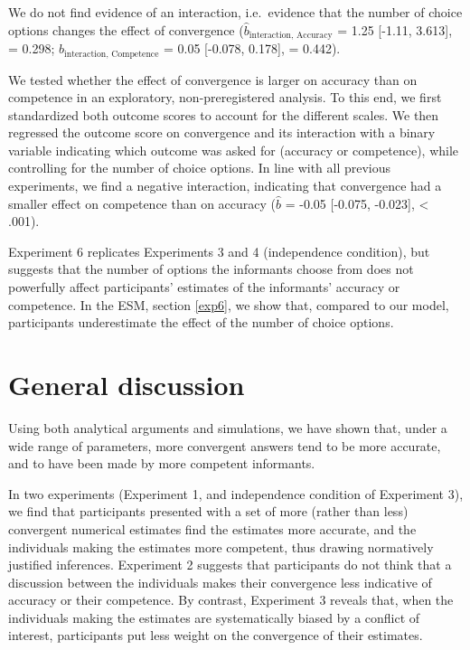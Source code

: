 \documentclass[
  doc,floatsintext]{apa6}
\begin{document}
We do not find evidence of an interaction, i.e.~evidence that the number of choice options changes the effect of convergence (\(\hat{b}_{\text{interaction, Accuracy}}\) = 1.25 {[}-1.11, 3.613{]}, = 0.298; \(\hat{b}_{\text{interaction, Competence}}\) = 0.05 {[}-0.078, 0.178{]}, = 0.442).

We tested whether the effect of convergence is larger on accuracy than on competence in an exploratory, non-preregistered analysis. To this end, we first standardized both outcome scores to account for the different scales. We then regressed the outcome score on convergence and its interaction with a binary variable indicating which outcome was asked for (accuracy or competence), while controlling for the number of choice options. In line with all previous experiments, we find a negative interaction, indicating that convergence had a smaller effect on competence than on accuracy (\(\hat{b}\) = -0.05 {[}-0.075, -0.023{]}, \textless{} .001).

Experiment 6 replicates Experiments 3 and 4 (independence condition), but suggests that the number of options the informants choose from does not powerfully affect participants' estimates of the informants' accuracy or competence. In the ESM, section \ref{exp6}, we show that, compared to our model, participants underestimate the effect of the number of choice options.

\section{General discussion}\label{general-discussion}

Using both analytical arguments and simulations, we have shown that, under a wide range of parameters, more convergent answers tend to be more accurate, and to have been made by more competent informants.

In two experiments (Experiment 1, and independence condition of Experiment 3), we find that participants presented with a set of more (rather than less) convergent numerical estimates find the estimates more accurate, and the individuals making the estimates more competent, thus drawing normatively justified inferences. Experiment 2 suggests that participants do not think that a discussion between the individuals makes their convergence less indicative of accuracy or their competence. By contrast, Experiment 3 reveals that, when the individuals making the estimates are systematically biased by a conflict of interest, participants put less weight on the convergence of their estimates.
\end{document}
